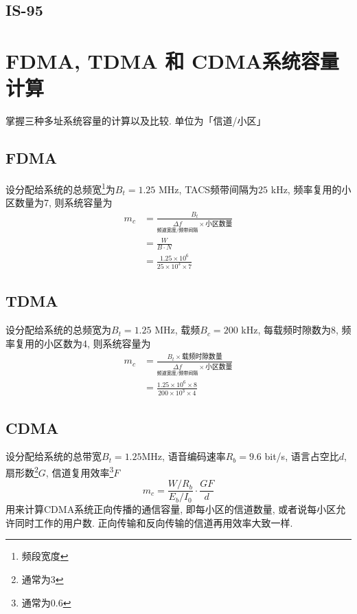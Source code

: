 \documentclass[a4paper]{report}
\begin{document}
\subsection{IS-95}

\section{FDMA, TDMA 和 CDMA系统容量计算}
掌握三种多址系统容量的计算以及比较. 单位为「信道/小区」
\subsection{FDMA}
设分配给系统的总频宽\footnote{频段宽度}为$B_t=1.25$ MHz, TACS频带间隔为$25$ kHz, 频率复用的小区数量为7, 则系统容量为
\begin{align*}
	m_c&=\frac{B_t}{\underset{\text{频道宽度/频带间隔}}{\Delta f}\times \text{小区数量}}\\
	&=\frac{W}{B\cdot N}\\
	&=\frac{1.25\times 10^6}{25\times 10^3\times 7}
\end{align*}
\subsection{TDMA}
设分配给系统的总频宽为$B_t=1.25$ MHz, 载频$B_c=200$ kHz, 每载频时隙数为8, 频率复用的小区数为4, 则系统容量为
\begin{align*}
	m_c&=\frac{B_t\times\text{载频时隙数量}}{\underset{\text{频道宽度/频带间隔}}{\Delta f}\times \text{小区数量}}\\
	&=\frac{1.25\times 10^6\times 8}{200\times 10^3\times 4}
\end{align*}


\subsection{CDMA}
设分配给系统的总带宽$B_t=1.25$MHz, 语音编码速率$R_b=9.6$ bit/s, 语言占空比$d$, 扇形数\footnote{通常为3}$G$, 信道复用效率\footnote{通常为0.6}$F$
\begin{equation}
	m_c=\frac{W/R_b}{E_b/I_0}\cdot\frac{GF}{d}
\end{equation}
用来计算CDMA系统正向传播的通信容量, 即每小区的信道数量, 或者说每小区允许同时工作的用户数. 正向传输和反向传输的信道再用效率大致一样. 
\end{document}
